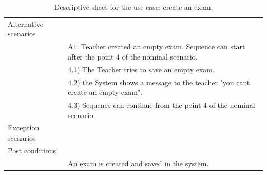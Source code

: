 \documentclass[]{uc2pfecaneva}
\begin{document}
\begin{table}[h]
\begin{tabularx}{\textwidth}{|l|X|}
            Alternative scenarios &                                                                                                             \\
            & A1: Teacher created an empty exam. Sequence can start after the point 4 of the nominal scenario.            \\
            & \hspace{4mm}4.1) The Teacher tries to save an empty exam.                                                    \\
            & \hspace{4mm}4.2) the System shows a message to the teacher "you cant create an empty exam".                  \\
            & \hspace{4mm}4.3) Sequence can continue from the point 4 of the nominal scenario.                             \\ \hline
            Exception scenarios   &                                                                                                             \\ \hline
            Post conditions       &                                                                                                             \\
            & An exam is created and saved in the system.                                                                 \\ \hline
        \end{tabularx}
        \caption{Descriptive sheet for the use case: create an exam.}
        \label{table:3}
    \end{table}
    \clearpage
\end{document}
